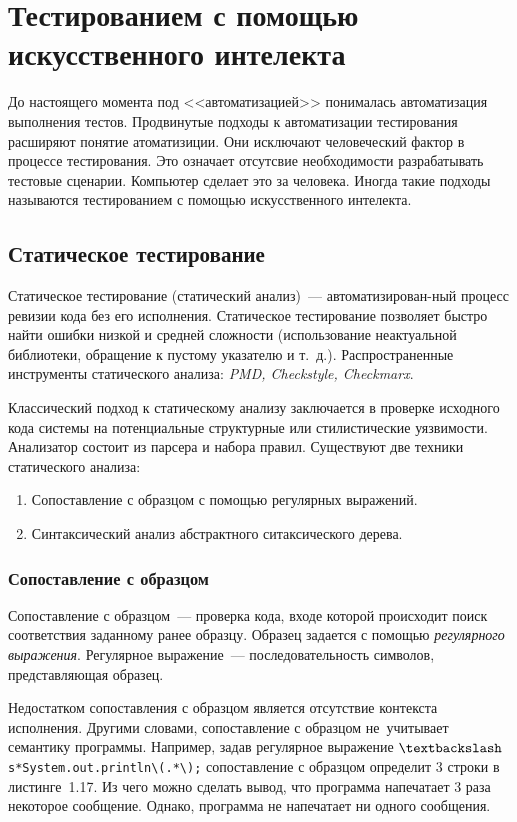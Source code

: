 \section{Тестированием с помощью искусственного интелекта} 

До настоящего момента под <<автоматизацией>> понималась автоматизация выполнения тестов. Продвинутые подходы к автоматизации тестирования расширяют понятие атоматизиции. Они исключают человеческий фактор в процессе тестирования. Это означает отсутсвие необходимости разрабатывать тестовые сценарии. Компьютер сделает это за человека. Иногда такие подходы называются тестированием с помощью искусственного интелекта.

\subsection{Статическое тестирование} 

Статическое тестирование (статический анализ)~--- автоматизирован-ный процесс ревизии кода без его исполнения. Статическое тестирование позволяет быстро найти ошибки низкой и средней сложности (использование неактуальной библиотеки, обращение к пустому указателю и т.~д.). Распространенные инструменты статического анализа: \textit{PMD, Checkstyle, Checkmarx}.

Классический подход к статическому анализу заключается в проверке исходного кода системы на потенциальные структурные или стилистические уязвимости. Анализатор состоит из парсера и набора правил. Существуют две техники статического анализа:


\begin{enumerate}
	\item Сопоставление с образцом с помощью регулярных выражений.
	\item Синтаксический анализ абстрактного ситаксического дерева.
\end{enumerate}


\subsubsection{Сопоставление с образцом}

Сопоставление с образцом~--- проверка кода, входе которой происходит поиск соответствия заданному ранее образцу. Образец задается с помощью \textit{регулярного выражения}. Регулярное выражение~--- последовательность символов, представляющая образец.

Недостатком сопоставления с образцом является отсутствие контекста исполнения. Другими словами, сопоставление с образцом не~учитывает семантику программы. Например, задав регулярное выражение \texttt{$\textbackslash$s*System.out.println\textbackslash(.*\textbackslash);} сопоставление с образцом определит 3 строки в листинге~1.17. Из чего можно сделать вывод, что программа напечатает 3 раза некоторое сообщение. Однако, программа не напечатает ни одного сообщения. 

